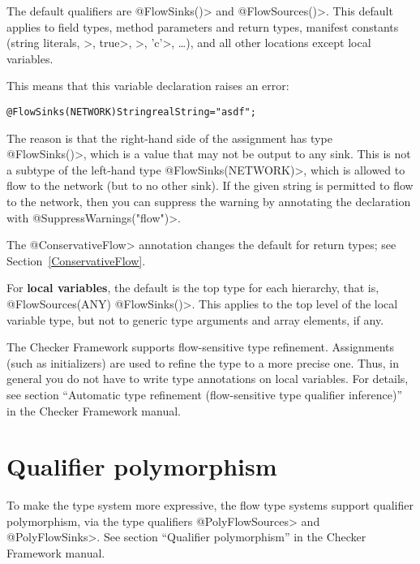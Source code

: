The default qualifiers are \<@FlowSinks({})> and \<@FlowSources({})>.  This
default applies to field types, method parameters and return types,
manifest constants
(string literals, >, \<true>, >, \<'c'>,
\ldots), and all other locations except local variables.

This means that this variable declaration raises an error:

\begin{alltt}
@FlowSinks(NETWORK) String realString = "asdf";
\end{alltt}

The reason is that the right-hand side of the assignment has type
\<@FlowSinks({})>, which is a value that may not be output to any sink.
This is not a subtype of the left-hand type \<@FlowSinks(NETWORK)>, which
is allowed to flow to the network (but to no other sink).  If the given
string is permitted to flow to the network, then you can suppress the
warning by annotating the declaration with \<@SuppressWarnings("flow")>.

The \<@ConservativeFlow> annotation changes the default for return types;
see Section~\ref{ConservativeFlow}.

For \textbf{local variables}, the default is the top type for each
hierarchy, that is, \<@FlowSources(ANY) @FlowSinks({})>.  This applies to
the top level of the local variable type, but not to generic type arguments
and array elements, if any.

The Checker
Framework supports flow-sensitive type refinement.  Assignments (such as
initializers) are used to refine the type to a more precise one.  Thus, in
general you do not have to write type annotations on local variables.  For
details, see section ``Automatic type refinement (flow-sensitive type
qualifier inference)'' in the Checker Framework manual.


\section{Qualifier polymorphism}

To make the type system more expressive, the flow type systems support
qualifier polymorphism, via the type qualifiers \<@PolyFlowSources> and
\<@PolyFlowSinks>.
See section ``Qualifier polymorphism'' in the Checker Framework manual.



